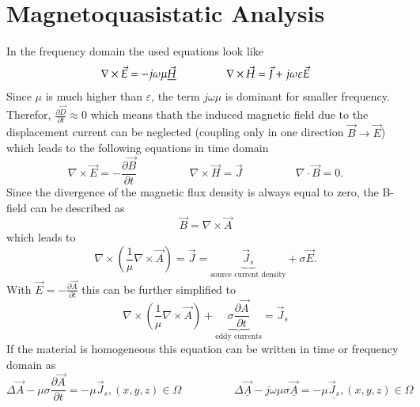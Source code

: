 \section{Magnetoquasistatic Analysis}
In the frequency domain the used equations look like 
\begin{equation*}
	\nabla \times \vec{E} = -j\omega\mu\underline{\vec{H}}
	\hspace{1.6cm}
	\nabla \times \vec{H} = \vec{J} + j\omega \varepsilon \vec{E}
\end{equation*}
Since $\mu$ is much higher than $\varepsilon$, the term $j\omega\mu$ is dominant for smaller frequency. Therefor, $\frac{\partial \vec{D}}{\partial t} \approx 0$ which means thath the induced magnetic field due to the displacement current can be neglected (coupling only in one direction $\vec{B} \rightarrow \vec{E}$) which leads to the following equations in time domain
\begin{equation*}
	\nabla \times \vec{E} = -\frac{\partial \vec{B}}{\partial t}
	\hspace{2cm}
	\nabla \times \vec{H} = \vec{J}
	\hspace{2cm}
	\nabla \cdot \vec{B} = 0.
\end{equation*}
Since the divergence of the magnetic flux density is always equal to zero, the B-field can be described as
\begin{equation*}
	\vec{B} = \nabla \times \vec{A}
\end{equation*}
which leads to 
\begin{equation*}
	\nabla \times \left(\frac{1}{\mu} \nabla \times \vec{A}\right) = \vec{J} = \underbrace{\vec{J}_s}_{\textrm{source current density}} + \sigma \vec{E}.
\end{equation*}
With $\vec{E} = - \frac{\partial \vec{A}}{\partial t}$ this can be further simplified to
\begin{equation*}
	\nabla \times \left(\frac{1}{\mu}\nabla \times \vec{A}\right) + \underbrace{\sigma \frac{\partial \vec{A}}{\partial t}}_{\textrm{eddy currents}} = \vec{J}_s
\end{equation*}
If the material is homogeneous this equation can be written in time or frequency domain as 
\begin{equation*}
	\Delta\vec{A} -\mu\sigma\frac{\partial \vec{A}}{\partial t} = -\mu \vec{J}_s, (x,y,z)\in \Omega
	\hspace{2cm}
	\Delta\underline{\vec{A}} - j\omega\mu\sigma\underline{\vec{A}} = -\mu\underline{\vec{J}_s}, (x,y,z)\in \Omega
\end{equation*}

